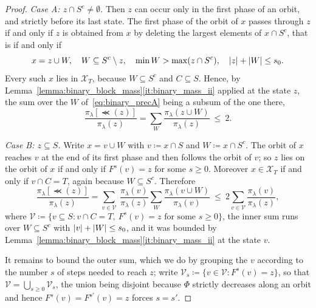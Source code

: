 \documentclass[aos]{imsart}%
\DeclarePairedDelimiter{\abs}{\lvert}{\rvert}
\newcommand{\ambientspace}[0]{\mathcal{X}}
\theoremstyle{plain}
\theoremstyle{definition}
\begin{document}
\begin{proof}
        \emph{Case A: $z\cap S^{c}\neq\emptyset$.} Then $z$ can occur only in
        the first phase of an orbit, and strictly before its last state.
        The first phase of the orbit of $x$ passes through $z$ if and only if
        $z$ is obtained from $x$ by deleting the largest elements of
        $x\cap S^{c}$, that is if and only if
        \begin{equation}
            \label{eq:binary_precA}
            x=z\cup W,\quad W\subseteq S^{c}\setminus z,\quad
            \min W>\max(z\cap S^{c}),\quad \abs z+\abs W\leq s_0 .
        \end{equation}
        Every such $x$ lies in $\ambientspace_T$, because $W\subseteq S^{c}$
        and $C\subseteq S$. Hence, by
        Lemma~\ref{lemma:binary_block_mass}\ref{it:binary_mass_ii} applied at
        the state $z$, the sum over the $W$ of~\eqref{eq:binary_precA} being a
        subsum of the one there,
        \begin{equation}
            \label{eq:binary_precA_mass}
            \frac{\pi_\lambda[\Prec(z)]}{\pi_\lambda(z)}
            =\sum_{W}\frac{\pi_\lambda(z\cup W)}{\pi_\lambda(z)}\ \leq\ 2 .
        \end{equation}

        \emph{Case B: $z\subseteq S$.} Write $x=v\cup W$ with
        $v\coloneq x\cap S$ and $W\coloneq x\cap S^{c}$. The orbit of $x$
        reaches $v$ at the end of its first phase and then follows the orbit of
        $v$; so $z$ lies on the orbit of $x$ if and only if $F^{s}(v)=z$ for
        some $s\geq0$. Moreover $x\in\ambientspace_T$ if and only if
        $v\cap C=T$, again because $W\subseteq S^{c}$. Therefore
        \begin{equation}
            \label{eq:binary_prec_factorise}
            \frac{\pi_\lambda[\Prec(z)]}{\pi_\lambda(z)}
            =\sum_{v\in\mathcal{V}}\ \frac{\pi_\lambda(v)}{\pi_\lambda(z)}
            \sum_{W}\frac{\pi_\lambda(v\cup W)}{\pi_\lambda(v)}
            \ \leq\ 2\sum_{v\in\mathcal{V}}
            \frac{\pi_\lambda(v)}{\pi_\lambda(z)},
        \end{equation}
        where $\mathcal{V}\coloneq\{v\subseteq S:v\cap C=T,\ F^{s}(v)=z
        \text{ for some }s\geq0\}$, the inner sum runs over
        $W\subseteq S^{c}$ with $\abs v+\abs W\leq s_0$, and it was bounded by
        Lemma~\ref{lemma:binary_block_mass}\ref{it:binary_mass_ii} at the state
        $v$.

        It remains to bound the outer sum, which we do by grouping the $v$
        according to the number $s$ of steps needed to reach $z$; write
        $\mathcal{V}_s\coloneq\{v\in\mathcal{V}:F^{s}(v)=z\}$, so that
        $\mathcal{V}=\bigcup_{s\geq0}\mathcal{V}_s$, the union being disjoint
        because $\Phi$ strictly decreases along an orbit and hence
        $F^{s}(v)=F^{s'}(v)=z$ forces $s=s'$.


\end{proof}
\end{document}
